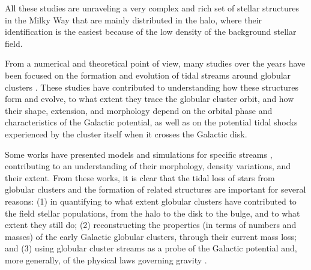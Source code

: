    All these studies are unraveling  a very complex and rich set of stellar structures in the Milky Way that are mainly distributed in the halo, where their identification is the easiest because of the low density of the background stellar field. 

    From a numerical and theoretical point of view, many studies over the years have been focused on the formation and evolution of tidal streams around globular clusters \citep{1975AJ.....80..290K, 1992ApJ...386..506O, 1992ApJ...386..519O, 1998ASPC..136...45G, 1999A&A...352..149C, 2002MNRAS.332..915I, 2002ApJ...570..656J, 2002JKAS...35...75Y, 2005AJ....129.1906C, 2005CeMDA..91...59D, 2007ApJ...659.1212M, 2008ApJ...681...40S, 2010MNRAS.401..105K, 2010MNRAS.406.2732L, 2012MNRAS.420.2700K, 2012A&A...546L...7M, 2013MNRAS.433.1813S,  2014ApJ...795...95B, 2016MNRAS.463L..17A, 2016MNRAS.463..102E, 2016MNRAS.457.3817S, 2017NatAs...1..633P, 2018ApJ...861...69C,  2018A&A...609A..44T, 2020ApJ...889..107C, 2022A&A...667A.112V}. These studies have contributed to understanding how these structures form and evolve, to what extent they trace the globular cluster orbit, and how their shape, extension, and morphology depend on the orbital phase and characteristics of the Galactic potential, as well as  on the potential tidal shocks experienced by the cluster itself when it crosses the Galactic disk.

    Some works have presented models and simulations for specific streams \citep{2004AJ....127.2753D, 2012A&A...546L...7M, 2019MNRAS.484.2009B, 2019ApJ...880...38B, 2021JCAP...10..043B, 2021DDA....5240106B}, contributing to an understanding of their morphology, density variations, and their extent. From these works, it is clear that the tidal loss of stars from globular clusters and the formation of related structures are important for several reasons: (1) in quantifying to what extent globular clusters have contributed to the field stellar populations, from the halo to the disk to the bulge, and to what extent they still do; (2) reconstructing the properties (in terms of numbers and masses) of the early Galactic globular clusters, through their current mass loss; and (3) using globular cluster streams as a probe of the Galactic potential and, more generally, of the physical laws governing gravity \citep[see, e.g., ][]{2018A&A...609A..44T, 2019ApJ...887L..12B, 2020PhRvD.102h4066N, 2021JCAP...10..043B}.


